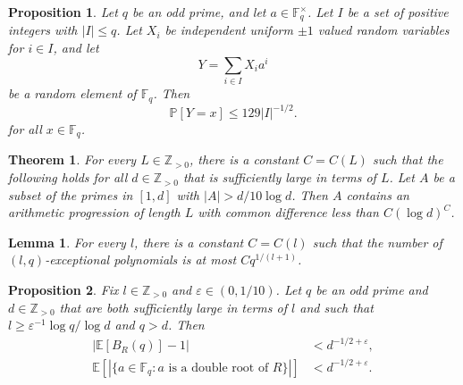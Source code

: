 \documentclass[10pt,a4paper]{amsart}
\newtheorem{proposition}{Proposition}
\newtheorem{theorem}{Theorem}
\newtheorem{lemma}{Lemma}
\def\E{\mathbb E}
\def\F{\mathbb F}
\def\P{\mathbb P}
\def\Z{\mathbb Z}
\newcommand{\e}{\varepsilon}
\begin{document}
\begin{proposition}\label{pr:exceptional}
Let $q$ be an odd prime, and let $a\in\F_q^\times$.
Let $I$ be a set of positive integers with $|I|\le q$.
Let $X_i$ be independent uniform $\pm1$ valued random variables for $i\in I$, and let
\[
Y=\sum_{i\in I} X_i a^i
\]
be a random element of $\F_q$.
Then
\[
\P[Y=x]\le 129 |I|^{-1/2}.
\]
for all $x\in \F_q$.
\end{proposition}

\begin{theorem}\label{th:Green-Tao}
For every $L\in\Z_{>0}$, there is a constant $C=C(L)$ such that the following
holds for all $d\in\Z_{>0}$ that is sufficiently large in terms of $L$.
Let $A$ be a subset of the primes in $[1,d]$ with $|A|>d/10\log d$.
Then $A$ contains an arithmetic progression of length $L$ with common difference
less than $C(\log d)^C$.
\end{theorem}

\begin{lemma}\label{lm:number-exceptional}
For every $l$, there is a constant $C=C(l)$ such that the number of
$(l,q)$-exceptional polynomials is at most
$Cq^{1/(l+1)}$.
\end{lemma}

\begin{proposition}\label{pr:number-roots-random-poly}
Fix $l\in\Z_{>0}$ and $\e\in(0,1/10)$.
Let $q$ be an odd prime and $d\in\Z_{>0}$ that are both sufficiently
large in terms of $l$ and such that $l\ge \e^{-1}\log q/\log d$ and $q>d$.
Then
\begin{align*}
|\E[B_R(q)]-1|&<d^{-1/2+\e},\\
\E[|\{a\in\F_q: \text{$a$ is a double root of $R$}\}|]&<d^{-1/2+\e}.
\end{align*}
\end{proposition}
\end{document}
